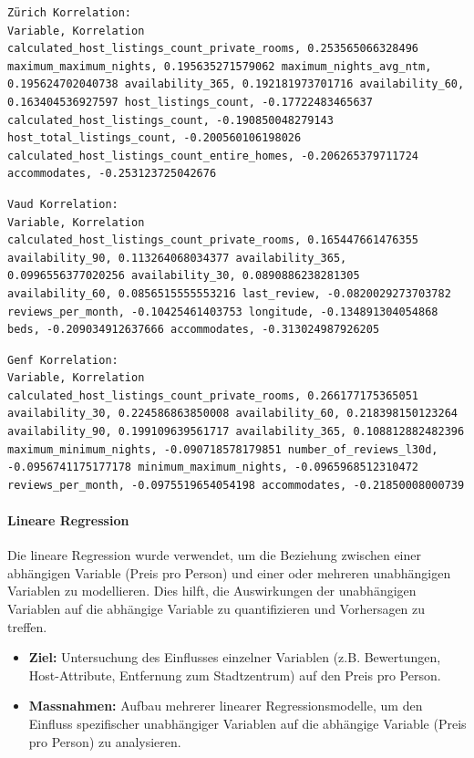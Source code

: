 \documentclass[
  journal,
]{IEEEtran}%
\let\oldparagraph\paragraph
\renewcommand{\paragraph}[1]{\oldparagraph{#1}\mbox{}}
\begin{document}
\begin{verbatim}
Zürich Korrelation:
Variable, Korrelation
calculated_host_listings_count_private_rooms, 0.253565066328496 maximum_maximum_nights, 0.195635271579062 maximum_nights_avg_ntm, 0.195624702040738 availability_365, 0.192181973701716 availability_60, 0.163404536927597 host_listings_count, -0.17722483465637 calculated_host_listings_count, -0.190850048279143 host_total_listings_count, -0.200560106198026 calculated_host_listings_count_entire_homes, -0.206265379711724 accommodates, -0.253123725042676 
\end{verbatim}

\begin{verbatim}
Vaud Korrelation:
Variable, Korrelation
calculated_host_listings_count_private_rooms, 0.165447661476355 availability_90, 0.113264068034377 availability_365, 0.0996556377020256 availability_30, 0.0890886238281305 availability_60, 0.0856515555553216 last_review, -0.0820029273703782 reviews_per_month, -0.10425461403753 longitude, -0.134891304054868 beds, -0.209034912637666 accommodates, -0.313024987926205 
\end{verbatim}

\begin{verbatim}
Genf Korrelation:
Variable, Korrelation
calculated_host_listings_count_private_rooms, 0.266177175365051 availability_30, 0.224586863850008 availability_60, 0.218398150123264 availability_90, 0.199109639561717 availability_365, 0.108812882482396 maximum_minimum_nights, -0.090718578179851 number_of_reviews_l30d, -0.0956741175177178 minimum_maximum_nights, -0.0965968512310472 reviews_per_month, -0.0975519654054198 accommodates, -0.21850008000739 
\end{verbatim}

\hypertarget{lineare-regression}{%
\paragraph{\texorpdfstring{\textbf{Lineare
Regression}}{Lineare Regression}}\label{lineare-regression}}

Die lineare Regression wurde verwendet, um die Beziehung zwischen einer
abhängigen Variable (Preis pro Person) und einer oder mehreren
unabhängigen Variablen zu modellieren. Dies hilft, die Auswirkungen der
unabhängigen Variablen auf die abhängige Variable zu quantifizieren und
Vorhersagen zu treffen.

\begin{itemize}
\item
  \textbf{Ziel:} Untersuchung des Einflusses einzelner Variablen (z.B.
  Bewertungen, Host-Attribute, Entfernung zum Stadtzentrum) auf den
  Preis pro Person.
\item
  \textbf{Massnahmen:} Aufbau mehrerer linearer Regressionsmodelle, um
  den Einfluss spezifischer unabhängiger Variablen auf die abhängige
  Variable (Preis pro Person) zu analysieren.
\end{itemize}
\end{document}
